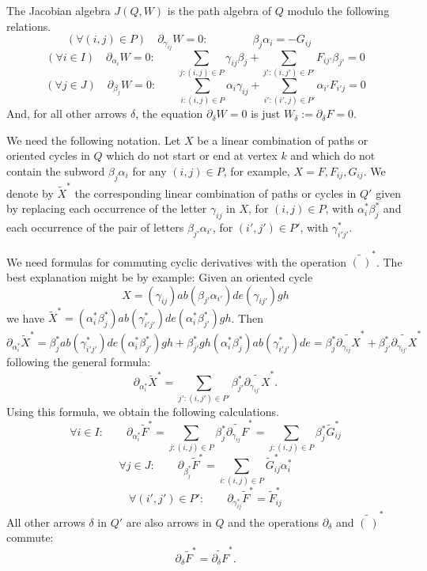 \documentclass[10pt]{amsart}
\theoremstyle{definition}
\begin{document}
The Jacobian algebra $J(Q,W)$ is the path algebra of $Q$ modulo the following relations.
\[
	(\forall (i,j)\in P)\quad \partial_{\gamma_{ij}}W=0:\qquad\qquad \beta_j\alpha_i=-G_{ij}\qquad\quad 
\]
\begin{equation}\label{partial alpha-i W=0}
	(\forall i\in I)\quad \partial_{\alpha_i}W=0:\qquad \sum_{j:(i,j)\in P} \gamma_{ij}\beta_j+\sum_{j':(i,j')\in P'} F_{ij'}\beta_{j'} =0
\end{equation}
\[
	(\forall j\in J)\quad \partial_{\beta_j}W=0:\qquad \sum_{i: (i,j)\in P} \alpha_i\gamma_{ij}+\sum_{i': (i',j)\in P'} \alpha_{i'}F_{i'j} =0
\]
And, for all other arrows $\delta$, the equation $\partial_\delta W=0$ is just $W_\delta:=\partial_\delta F=0$.

We need the following notation. Let $X$ be a linear combination of paths or oriented cycles in $Q$ which do not start or end at vertex $k$ and which do not contain the subword $\beta_j\alpha_i$ for any $(i,j)\in P$, for example, $X=F,F_{ij},G_{ij}$. We denote by $\widetilde X^\ast$ the corresponding linear combination of paths or cycles in $Q'$ given by replacing each occurrence of the letter $\gamma_{ij}$ in $X$, for $(i,j)\in P$, with $\alpha_i^\ast\beta_j^\ast$ and each occurrence of the pair of letters $\beta_{j'}\alpha_{i'}$, for $(i',j')\in P'$, with $\gamma_{i'j'}^\ast$. 

We need formulas for commuting cyclic derivatives with the operation $\widetilde{(\ )}^\ast$. The best explanation might be by example: Given an oriented cycle 
\[X=(\gamma_{ij})ab(\beta_{j'}\alpha_{i'})de(\gamma_{ij'})gh
\]
 we have $\widetilde X^\ast=
(\alpha_i^\ast\beta_j^\ast)  ab( \gamma_{i'j'}^\ast )de(\alpha_i^\ast\beta_{j'}^\ast )gh$. Then 
\[
\partial_{\alpha_i^\ast} \widetilde X^\ast=\beta_j^\ast  ab( \gamma_{i'j'}^\ast )de(\alpha_i^\ast\beta_{j'}^\ast )gh+
\beta_{j'}^\ast gh (\alpha_i^\ast\beta_j^\ast)  ab( \gamma_{i'j'}^\ast )de
= \beta_j^\ast \widetilde{\partial_{\gamma_{ij}}X}^\ast+\beta_{j'}^\ast \widetilde{\partial_{\gamma_{ij'}}X}^\ast
\]
following the general formula:
\[
	\partial_{\alpha_i^\ast} \widetilde X^\ast=\sum_{j':(i,j')\in P'}\beta_{j'}^\ast \widetilde{\partial_{\gamma_{ij'}}X}^\ast .
\]
Using this formula, we obtain the following calculations.
\begin{equation}\label{eq: derivative of tilde F}
	\forall i\in I:\qquad \partial_{\alpha_i^\ast}\widetilde F^\ast=\sum_{j:(i,j)\in P}\beta_{j}^\ast \widetilde{\partial_{\gamma_{ij}}F}^\ast
	=\sum_{j:(i,j)\in P}\beta_{j}^\ast \widetilde G_{ij}^\ast
\end{equation}
\[
	\forall j\in J:\qquad \partial_{\beta_j^\ast}\widetilde F^\ast=\sum_{i:(i,j)\in P} \widetilde G_{ij}^\ast\alpha_{i}^\ast
\]
\[
	\forall (i',j')\in P': \qquad \partial_{\gamma_{ij}^\ast}\widetilde F^\ast=\widetilde F_{ij}^\ast
\]
All other arrows $\delta$ in $Q'$ are also arrows in $Q$ and the operations $\partial_\delta$ and $\widetilde{(\ )}^\ast$ commute:
\[
	\partial_\delta \widetilde F^\ast=\widetilde{\partial_\delta F}^\ast.
\]
\end{document}
